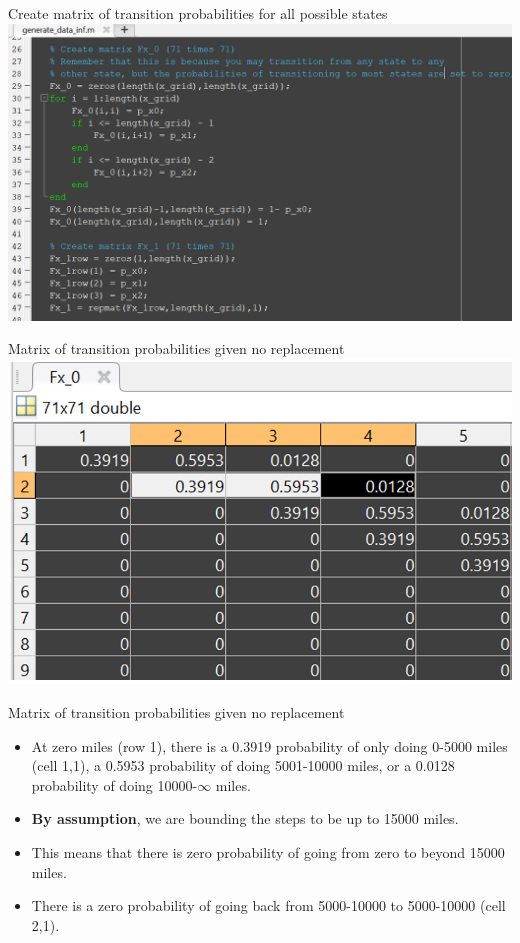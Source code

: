 \documentclass[aspectratio=169]{beamer}
\begin{document}
	\begin{frame}{Create matrix of transition probabilities for all possible states}
		\includegraphics[width=\textwidth]{figs/2_transmat.PNG}
	\end{frame}
	
	\begin{frame}{Matrix of transition probabilities given no replacement}
		\includegraphics[width=\textwidth]{figs/2_transmat_fx0.PNG}
	\end{frame}
	
	
	\begin{frame}{Matrix of transition probabilities given no replacement}
		
		\begin{itemize}
			\itemsep1em
			\item At zero miles (row 1), there is a 0.3919 probability of only doing 0-5000 miles (cell 1,1), a 0.5953 probability of doing 5001-10000 miles, or a 0.0128 probability of doing 10000-$\infty$ miles.
			\item \textbf{By assumption}, we are bounding the steps to be up to 15000 miles.
			\item This means that there is zero probability of going from zero to beyond 15000 miles.	
			\item There is a zero probability of going back from 5000-10000 to 5000-10000 (cell 2,1).
		\end{itemize}
	\end{frame}
	
\end{document}

